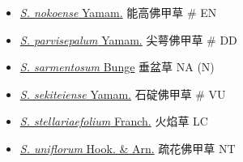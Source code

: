 \begin{itemize}
\begin{itemize}
        \item[] \href{http://www.theplantlist.org/tpl1.1/search?q=Sedum+nokoense}{\textit{S. nokoense} Yamam.}   能高佛甲草  \# EN
        \item[] \href{http://www.theplantlist.org/tpl1.1/search?q=Sedum+parvisepalum}{\textit{S. parvisepalum} Yamam.}   尖萼佛甲草  \# DD
        \item[] \href{http://www.theplantlist.org/tpl1.1/search?q=Sedum+sarmentosum}{\textit{S. sarmentosum} Bunge}   垂盆草   NA (N)
        \item[] \href{http://www.theplantlist.org/tpl1.1/search?q=Sedum+sekiteiense}{\textit{S. sekiteiense} Yamam.}   石碇佛甲草  \# VU
        \item[] \href{http://www.theplantlist.org/tpl1.1/search?q=Sedum+stellariaefolium}{\textit{S. stellariaefolium} Franch.}   火焰草   LC
        \item[] \href{http://www.theplantlist.org/tpl1.1/search?q=Sedum+uniflorum}{\textit{S. uniflorum} Hook. \& Arn.}   疏花佛甲草   NT
  \end{itemize}
  \end{itemize}
